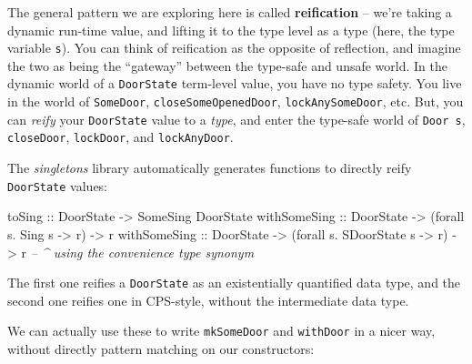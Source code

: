 \documentclass[]{article}
\newenvironment{Shaded}{}{}
\newcommand{\CommentTok}[1]{\textcolor[rgb]{0.38,0.63,0.69}{\textit{#1}}}
\newcommand{\DataTypeTok}[1]{\textcolor[rgb]{0.56,0.13,0.00}{#1}}
\newcommand{\FunctionTok}[1]{\textcolor[rgb]{0.02,0.16,0.49}{#1}}
\newcommand{\NormalTok}[1]{#1}
\newcommand{\OtherTok}[1]{\textcolor[rgb]{0.00,0.44,0.13}{#1}}
\begin{document}
The general pattern we are exploring here is called \textbf{reification} --
we're taking a dynamic run-time value, and lifting it to the type level as a
type (here, the type variable \texttt{s}). You can think of reification as the
opposite of reflection, and imagine the two as being the ``gateway'' between the
type-safe and unsafe world. In the dynamic world of a \texttt{DoorState}
term-level value, you have no type safety. You live in the world of
\texttt{SomeDoor}, \texttt{closeSomeOpenedDoor}, \texttt{lockAnySomeDoor}, etc.
But, you can \emph{reify} your \texttt{DoorState} value to a \emph{type}, and
enter the type-safe world of \texttt{Door\ s}, \texttt{closeDoor},
\texttt{lockDoor}, and \texttt{lockAnyDoor}.

The \emph{singletons} library automatically generates functions to directly
reify \texttt{DoorState} values:

\begin{Shaded}
\begin{Highlighting}[]
\OtherTok{toSing       ::} \DataTypeTok{DoorState} \OtherTok{->} \DataTypeTok{SomeSing} \DataTypeTok{DoorState}
\OtherTok{withSomeSing ::} \DataTypeTok{DoorState} \OtherTok{->}\NormalTok{ (forall s}\FunctionTok{.} \DataTypeTok{Sing}\NormalTok{ s        }\OtherTok{->}\NormalTok{ r) }\OtherTok{->}\NormalTok{ r}
\OtherTok{withSomeSing ::} \DataTypeTok{DoorState} \OtherTok{->}\NormalTok{ (forall s}\FunctionTok{.} \DataTypeTok{SDoorState}\NormalTok{ s  }\OtherTok{->}\NormalTok{ r) }\OtherTok{->}\NormalTok{ r}
                                     \CommentTok{-- ^ using the convenience type synonym}
\end{Highlighting}
\end{Shaded}

The first one reifies a \texttt{DoorState} as an existentially quantified data
type, and the second one reifies one in CPS-style, without the intermediate data
type.

We can actually use these to write \texttt{mkSomeDoor} and \texttt{withDoor} in
a nicer way, without directly pattern matching on our constructors:
\end{document}
